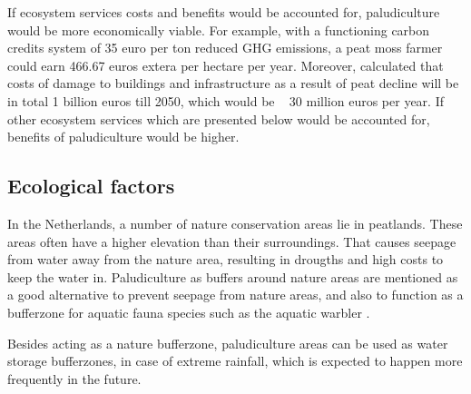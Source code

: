 \documentclass[a4paper,12pt]{scrbook}
\begin{document}
If ecosystem services costs and benefits would be accounted for, paludiculture would be more economically viable. For example, with a functioning carbon credits system of 35 euro per ton reduced GHG emissions, a peat moss farmer could earn 466.67 euros extera per hectare per year. Moreover, \citet{born} calculated that costs of damage to buildings and infrastructure as a result of peat decline will be in total 1 billion euros till 2050, which would be ~ 30 million euros per year. If other ecosystem services which are presented below would be accounted for, benefits of paludiculture would be higher.

\subsection{Ecological factors}
In the Netherlands, a number of nature conservation areas lie in peatlands. These areas often have a higher elevation than their surroundings. That causes seepage from water away from the nature area, resulting in drougths and high costs to keep the water in. Paludiculture as buffers around nature areas are mentioned as a good alternative to prevent seepage from nature areas, and also to function as a bufferzone for aquatic fauna species such as the aquatic warbler \citep{riet2014}. 

Besides acting as a nature bufferzone, paludiculture areas can be used as water storage bufferzones, in case of extreme rainfall, which is expected to happen more frequently in the future. 
\end{document}
